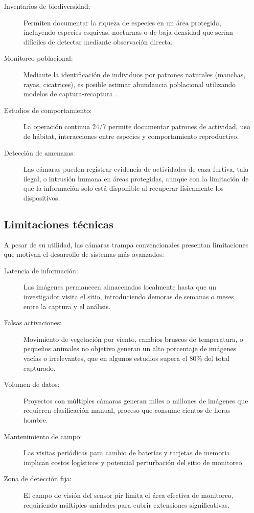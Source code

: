 \documentclass[a4paper, 12pt]{report}
\begin{document}
\begin{description}
  \item[Inventarios de biodiversidad:] Permiten documentar la riqueza de
    especies en un área protegida, incluyendo especies esquivas, nocturnas
    o de baja densidad que serían difíciles de detectar mediante
    observación directa.
  \item[Monitoreo poblacional:] Mediante la identificación de individuos por
    patrones naturales (manchas, rayas, cicatrices), es posible estimar
    abundancia poblacional utilizando modelos de captura-recaptura
    \cite{dibitetti2003yaguarete}.
  \item[Estudios de comportamiento:] La operación continua 24/7 permite
    documentar patrones de actividad, uso de hábitat, interacciones
    entre especies y comportamiento reproductivo.
  \item[Detección de amenazas:] Las cámaras pueden registrar evidencia de
    actividades de \gls{caza-furtiva}, tala ilegal, o intrusión humana
    en áreas protegidas, aunque con la limitación de que la información
    solo está disponible al recuperar físicamente los dispositivos.
\end{description}

\subsection{Limitaciones técnicas}

A pesar de su utilidad, las cámaras trampa convencionales presentan
limitaciones que motivan el desarrollo de sistemas más avanzados:

\begin{description}
  \item[Latencia de información:] Las imágenes permanecen almacenadas
    localmente hasta que un investigador visita el sitio, introduciendo
    demoras de semanas o meses entre la captura y el análisis.
  \item[Falsas activaciones:] Movimiento de vegetación por viento, cambios
    bruscos de temperatura, o pequeños animales no objetivo generan
    un alto porcentaje de imágenes vacías o irrelevantes, que en algunos
    estudios supera el 80\% del total capturado.
  \item[Volumen de datos:] Proyectos con múltiples cámaras generan miles
    o millones de imágenes que requieren clasificación manual, proceso
    que consume cientos de horas-hombre.
  \item[Mantenimiento de campo:] Las visitas periódicas para cambio de
    baterías y tarjetas de memoria implican costos logísticos y
    potencial perturbación del sitio de monitoreo.
  \item[Zona de detección fija:] El campo de visión del sensor \gls{pir}
    limita el área efectiva de monitoreo, requiriendo múltiples
    unidades para cubrir extensiones significativas.
\end{description}
\end{document}
